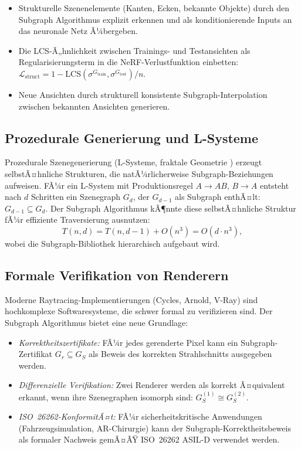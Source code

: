 ﻿\documentclass[a4paper,12pt]{article}
\theoremstyle{definition}
\begin{document}
\begin{itemize}
  \item Strukturelle Szenenelemente (Kanten, Ecken, bekannte
        Objekte) durch den Subgraph Algorithmus explizit erkennen
        und als konditionierende Inputs an das neuronale Netz
        Ã¼bergeben.
  \item Die LCS-Ã„hnlichkeit zwischen Trainings- und
        Testansichten als Regularisierungsterm in die
        NeRF-Verlustfunktion einbetten:
        $\mathcal{L}_{\mathrm{struct}} = 1 -
        \mathrm{LCS}(\sigma^{G_{\mathrm{train}}},
        \sigma^{G_{\mathrm{test}}}) / n$.
  \item Neue Ansichten durch strukturell konsistente
        Subgraph-Interpolation zwischen bekannten Ansichten
        generieren.
\end{itemize}

\subsection{Prozedurale Generierung und L-Systeme}

Prozedurale Szenegenerierung (L-Systeme, fraktale Geometrie
\citep{Mandelbrot1982}) erzeugt selbstÃ¤hnliche Strukturen, die
natÃ¼rlicherweise Subgraph-Beziehungen aufweisen. FÃ¼r ein
L-System mit Produktionsregel $A \to AB$, $B \to A$ entsteht
nach $d$ Schritten ein Szenegraph $G_d$, der $G_{d-1}$ als
Subgraph enthÃ¤lt: $G_{d-1} \subseteq G_d$. Der Subgraph
Algorithmus kÃ¶nnte diese selbstÃ¤hnliche Struktur fÃ¼r
effiziente Traversierung ausnutzen:
\[
  T(n, d) = T(n, d-1) + O(n^3) = O(d \cdot n^3),
\]
wobei die Subgraph-Bibliothek hierarchisch aufgebaut wird.

\subsection{Formale Verifikation von Renderern}

Moderne Raytracing-Implementierungen (Cycles, Arnold, V-Ray) sind
hochkomplexe Softwaresysteme, die schwer formal zu verifizieren sind.
Der Subgraph Algorithmus bietet eine neue Grundlage:

\begin{itemize}
  \item \emph{Korrektheitszertifikate:} FÃ¼r jedes gerenderte Pixel
        kann ein Subgraph-Zertifikat $G_r \subseteq G_S$ als
        Beweis des korrekten Strahlschnitts ausgegeben werden.
  \item \emph{Differenzielle Verifikation:} Zwei Renderer werden
        als korrekt Ã¤quivalent erkannt, wenn ihre Szenegraphen
        isomorph sind: $G_S^{(1)} \cong G_S^{(2)}$.
  \item \emph{ISO~26262-KonformitÃ¤t:} FÃ¼r sicherheitskritische
        Anwendungen (Fahrzeugsimulation, AR-Chirurgie) kann der
        Subgraph-Korrektheitsbeweis als formaler Nachweis gemÃ¤ÃŸ
        ISO~26262 ASIL-D verwendet werden.
\end{itemize}
\end{document}
